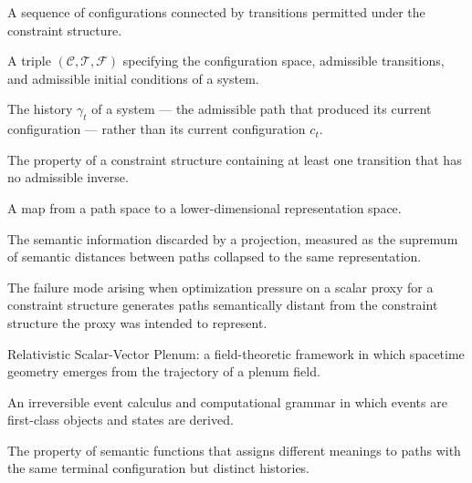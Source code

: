 \documentclass[12pt, twoside]{article}
\theoremstyle{plain}
\theoremstyle{definition}
\theoremstyle{remark}
\newcommand{\Cfg}{\mathcal{C}}
\newcommand{\Trans}{\mathcal{T}}
\begin{document}
\begin{description}[leftmargin=2.2cm, style=nextline]
\item[Admissible path]
  A sequence of configurations connected by transitions permitted
  under the constraint structure.
\item[Constraint structure]
  A triple $(\Cfg, \Trans, \mathcal{F})$ specifying the configuration space,
  admissible transitions, and admissible initial conditions of a system.
\item[Identity (system)]
  The history $\gamma_t$ of a system — the admissible path that produced
  its current configuration — rather than its current configuration $c_t$.
\item[Irreversibility]
  The property of a constraint structure containing at least one
  transition that has no admissible inverse.
\item[Projection]
  A map from a path space to a lower-dimensional representation space.
\item[Projection loss]
  The semantic information discarded by a projection, measured as the
  supremum of semantic distances between paths collapsed to the same
  representation.
\item[Proxy divergence (Goodhart effect)]
  The failure mode arising when optimization pressure on a scalar proxy
  for a constraint structure generates paths semantically distant from
  the constraint structure the proxy was intended to represent.
\item[RSVP]
  Relativistic Scalar-Vector Plenum: a field-theoretic framework in which
  spacetime geometry emerges from the trajectory of a plenum field.
\item[Spherepop]
  An irreversible event calculus and computational grammar in which
  events are first-class objects and states are derived.
\item[Trajectory-dependence]
  The property of semantic functions that assigns different meanings
  to paths with the same terminal configuration but distinct histories.
\end{description}
\end{document}
